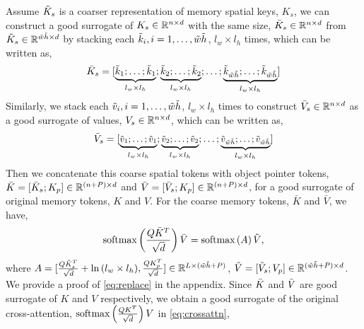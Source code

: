 Assume $\Tilde{K}_s$ is a coarser representation of memory spatial keys, $K_s$, we can construct a good surrogate of $K_s \in \mathbb{R}^{n \times d}$ with the same size, $\Bar{K}_s \in \mathbb{R}^{n \times d}$ from $\Tilde{K}_s \in \mathbb{R}^{\Tilde{w}\Tilde{h} \times d}$ by stacking each $\Tilde{k}_i, i = 1, \dots, \Tilde{w}\Tilde{h}$, $l_w\times l_h$ times, which can be written as,
\begin{align*}
    \Bar{K}_s = [\underbrace{\Tilde{k}_1; \dots; \Tilde{k}_1}_{l_w\times l_h}; \underbrace{\Tilde{k}_2; \dots; \Tilde{k}_2}_{l_w\times l_h}; \dots; \underbrace{\Tilde{k}_{\Tilde{w}\Tilde{h}}; \dots; \Tilde{k}_{\Tilde{w}\Tilde{h}}}_{l_w\times l_h}]
\end{align*}
Similarly, we stack each $\Tilde{v}_i, i =1, \dots, \Tilde{w}\Tilde{h}$, $l_w\times l_h$ times to construct $\Bar{V}_s  \in \mathbb{R}^{n \times d}$ as a good surrogate of values, $V_s \in \mathbb{R}^{n\times d}$, which can be written as,
\begin{align*}
    \small 
    \Bar{V}_s= [\underbrace{\Tilde{v}_1; \dots; \Tilde{v}_1}_{l_w\times l_h}; \underbrace{\Tilde{v}_2; \dots; \Tilde{v}_2}_{l_w \times l_h}; \dots; \underbrace{\Tilde{v}_{\Tilde{w}\Tilde{h}}; \dots; \Tilde{v}_{\Tilde{w}\Tilde{h}}}_{l_w \times l_h}]
\end{align*}
Then we concatenate this coarse spatial tokens with object pointer tokens, $\Bar{K} = [\Bar{K}_s; K_p]\in \mathbb{R}^{(n+P)\times d}$ and $\Bar{V} = [\Bar{V}_s; K_p]\in \mathbb{R}^{(n+P)\times d}$, for a good surrogate of original memory tokens, $K$ and $V$. For the coarse memory tokens, $\bar{K}$ and $\bar{V}$, we have,
\begin{align}\label{eq:replace}
    \text{softmax}\left(\frac{Q\Bar{K}^{T}}{\sqrt{d}}\right)\Bar{V} = \text{softmax}\left( A \right)\Tilde{V},
\end{align}
where $A = [\frac{Q\Tilde{K}_s^{T}}{\sqrt{d}} + \ln{(l_w\times l_h)}, \frac{QK_p^{T}}{\sqrt{d}}] \in \mathbb{R}^{L\times (\Tilde{w}\Tilde{h} + P)}$, $\Tilde{V} = [\Tilde{V}_s; V_p] \in \mathbb{R}^{(\Tilde{w}\Tilde{h}+P)\times d}$. We provide a proof of \cref{eq:replace} in the appendix. 
Since $\Bar{K}$ and $\Bar{V}$ are good surrogate of $K$ and $V$ respectively, we obtain a good surrogate of the original cross-attention, $\text{softmax}\left(\frac{QK^T}{\sqrt{d}}\right) V$ in \cref{eq:crossattn},
